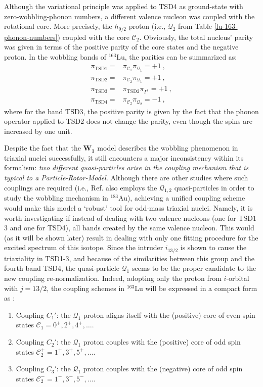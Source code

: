 Although the variational principle was applied to TSD4 as ground-state with zero-wobbling-phonon numbers, a different valence nucleon was coupled with the rotational core. More precisely, the $h_{9/2}$ proton (i.e., $\mathcal{Q}_2$ from Table \ref{lu-163-phonon-numbers}) coupled with the core $\mathscr{C}_2$. Obviously, the total nucleus' parity was given in terms of the positive parity of the core states and the negative proton. In the wobbling bands of $^{163}$Lu, the parities can be summarized as:
\begin{align}
    \pi_\text{TSD1}=&\pi_{\mathscr{C}_1}\pi_{\mathcal{Q}_1}=+1\ ,\nonumber\\
    \pi_\text{TSD2}=&\pi_{\mathscr{C}_2}\pi_{\mathcal{Q}_1}=+1\ ,\nonumber\\
    \pi_\text{TSD3}=&\pi_\text{TSD2}\pi_{\Gamma^\dagger}=+1\ ,\nonumber\\
    \pi_\text{TSD4}=&\pi_{\mathscr{C}_2}\pi_{\mathcal{Q}_2}=-1\ ,
    \label{aw1-parity-list-TSD-bands}
\end{align}
where for the band TSD3, the positive parity is given by the fact that the phonon operator applied to TSD2 does not change the parity, even though the spins are increased by one unit. 

Despite the fact that the $\mathbf{W_1}$ model describes the wobbling phenomenon in triaxial nuclei successfully, it still encounters a major inconsistency within its formalism: \emph{two different quasi-particles arise in the coupling mechanism that is typical to a Particle-Rotor-Model}. Although there are other studies where such couplings are required (i.e., Ref. \cite{nandi2020first} also employs the $\mathcal{Q}_{1,2}$ quasi-particles in order to study the wobbling mechanism in $^{183}$Au), achieving a unified coupling scheme would make this model a `robust' tool for odd-mass triaxial nuclei. Namely, it is worth investigating if instead of dealing with two valence nucleons (one for TSD1-3 and one for TSD4), all bands created by the same valence nucleon. This would (as it will be shown later) result in dealing with only one fitting procedure for the excited spectrum of this isotope. Since the intruder $i_{13/2}$ is shown to cause the triaxiality in TSD1-3, and because of the similarities between this group and the fourth band TSD4, the quasi-particle $\mathcal{Q}_1$ seems to be the proper candidate to the new coupling re-normalization. Indeed, adopting only the proton from $i$-orbital with $j=13/2$, the coupling schemes in $^{163}$Lu will be expressed in a compact form as \cite{poenaru2021extensive1}:
\begin{enumerate}
    \item Coupling $C_1'$: the $\mathcal{Q}_1$ proton aligns itself with the (positive) core of even spin states $\mathscr{C}_1=0^+,2^+,4^+,\dots$.
    \item Coupling $C_2'$: the $\mathcal{Q}_1$ proton couples with the (positive) core of odd spin states $\mathscr{C}_2^+=1^+,3^+,5^+,\dots$.
    \item Coupling $C_3'$: the $\mathcal{Q}_1$ proton couples with the (negative) core of odd spin states $\mathscr{C}_2^-=1^-,3^-,5^-,\dots$.
\end{enumerate}

